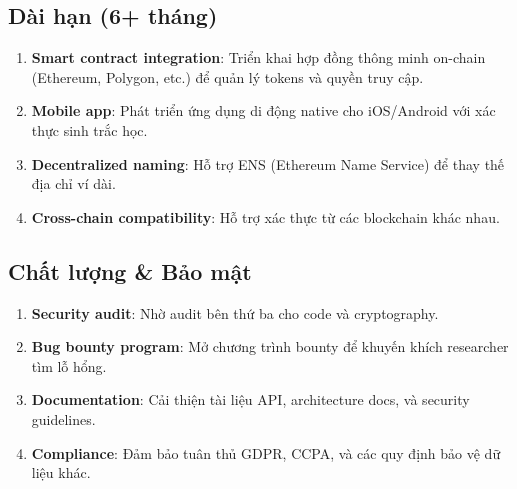 \subsection*{Dài hạn (6+ tháng)}
\begin{enumerate}
  \item \textbf{Smart contract integration}: Triển khai hợp đồng thông minh on-chain (Ethereum, Polygon, etc.) để quản lý tokens và quyền truy cập.
  \item \textbf{Mobile app}: Phát triển ứng dụng di động native cho iOS/Android với xác thực sinh trắc học.
  \item \textbf{Decentralized naming}: Hỗ trợ ENS (Ethereum Name Service) để thay thế địa chỉ ví dài.
  \item \textbf{Cross-chain compatibility}: Hỗ trợ xác thực từ các blockchain khác nhau.
\end{enumerate}

\subsection*{Chất lượng & Bảo mật}
\begin{enumerate}
  \item \textbf{Security audit}: Nhờ audit bên thứ ba cho code và cryptography.
  \item \textbf{Bug bounty program}: Mở chương trình bounty để khuyến khích researcher tìm lỗ hổng.
  \item \textbf{Documentation}: Cải thiện tài liệu API, architecture docs, và security guidelines.
  \item \textbf{Compliance}: Đảm bảo tuân thủ GDPR, CCPA, và các quy định bảo vệ dữ liệu khác.
\end{enumerate}

